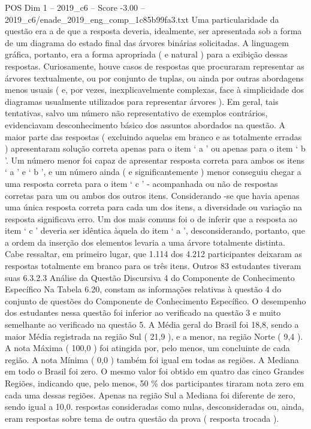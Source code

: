 \begin{textsample}{POS Dim 1 – 2019\_c6 – Score -3.00 – 2019\_c6/enade\_2019\_eng\_comp\_1c85b99fa3.txt}
Uma particularidade da questão era a de que a resposta deveria, idealmente, ser apresentada sob a forma de um diagrama do estado final das árvores binárias solicitadas.
A linguagem gráfica, portanto, era a forma apropriada ( e natural ) para a exibição dessas respostas.
Curiosamente, houve casos de respostas que procuraram representar as árvores textualmente, ou por conjunto de tuplas, ou ainda por outras abordagens menos usuais ( e, por vezes, inexplicavelmente complexas, face à simplicidade dos diagramas usualmente utilizados para representar árvores ).
Em geral, tais tentativas, salvo um número não representativo de exemplos contrários, evidenciavam desconhecimento básico dos assuntos abordados na questão.
A maior parte das respostas ( excluindo aquelas em branco e as totalmente erradas ) apresentaram solução correta apenas para o item ‘ a ’ ou apenas para o item ‘ b ’.
Um número menor foi capaz de apresentar resposta correta para ambos os itens ‘ a ’ e ‘ b ’, e um número ainda ( e significantemente ) menor conseguiu chegar a uma resposta correta para o item ‘ c ’ - acompanhada ou não de respostas corretas para um ou ambos dos outros itens.
Considerando -se que havia apenas uma única resposta correta para cada um dos itens, a diversidade ou variação na resposta significava erro.
Um dos mais comuns foi o de inferir que a resposta ao item ‘ c ’ deveria ser idêntica àquela do item ‘ a ’, desconsiderando, portanto, que a ordem da inserção dos elementos levaria a uma árvore totalmente distinta.
Cabe ressaltar, em primeiro lugar, que 1.114 dos 4.212 participantes deixaram as respostas totalmente em branco para os três itens.
Outros 83 estudantes tiveram suas 6.3.2.3 Análise da Questão Discursiva 4 do Componente de Conhecimento Específico Na Tabela 6.20, constam as informações relativas à questão 4 do conjunto de questões do Componente de Conhecimento Específico.
O desempenho dos estudantes nessa questão foi inferior ao verificado na questão 3 e muito semelhante ao verificado na questão 5.
A Média geral do Brasil foi 18,8, sendo a maior Média registrada na região Sul ( 21,9 ), e a menor, na região Norte ( 9,4 ).
A nota Máxima ( 100,0 ) foi atingida por, pelo menos, um concluinte de cada região.
A nota Mínima ( 0,0 ) também foi igual em todas as regiões.
A Mediana em todo o Brasil foi zero.
O mesmo valor foi obtido em quatro das cinco Grandes Regiões, indicando que, pelo menos, 50 \% dos participantes tiraram nota zero em cada uma dessas regiões.
Apenas na região Sul a Mediana foi diferente de zero, sendo igual a 10,0. respostas consideradas como nulas, desconsideradas ou, ainda, eram respostas sobre tema de outra questão da prova ( resposta trocada ).

\end{textsample}
